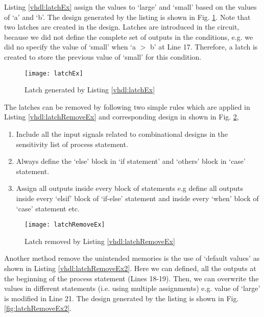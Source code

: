Listing \ref{vhdl:latchEx} assign the values to `large' and `small' based on the values of `a' and `b'. The design generated by the listing is shown in Fig. \ref{fig:latchEx}. Note that two latches are created in the design. Latches are introduced in the circuit, because we did not define the complete set of outputs in the conditions, e.g. we did no specify the value of `small' when `a $>$ b' at Line 17. Therefore, a latch is created to store the previous value of `small' for this condition. 



\begin{figure}[!h]
	\centering
	\texttt{[image: latchEx]}
	\caption{Latch generated by Listing \ref{vhdl:latchEx}}
	\label{fig:latchEx}
\end{figure}


\begin{noNumBox}
	The latches can be removed by following two simple rules which are applied in Listing \ref{vhdl:latchRemoveEx} and corresponding design in shown in Fig. \ref{fig:latchRemoveEx}, 
	\begin{enumerate}
		\item Include all the input signals related to combinational designs in the sensitivity list of process statement. 
		\item Always define the `else' block in `if statement' and `others' block in `case' statement. 
		\item Assign all outputs inside every block of statements e.g define all outputs inside every `elsif' block of `if-else' statement and inside every  `when' block of `case' statement etc. 
	\end{enumerate}
\end{noNumBox}



\begin{figure}
	\centering
	\texttt{[image: latchRemoveEx]}
	\caption{Latch removed by Listing \ref{vhdl:latchRemoveEx}}
	\label{fig:latchRemoveEx}
\end{figure}


Another method remove the unintended memories is the use of `default values' as shown in Listing \ref{vhdl:latchRemoveEx2}. Here we can defined, all the outputs at the beginning of the process statement (Lines 18-19). Then, we can overwrite the values in different statements (i.e. using multiple assignments) e.g. value of `large' is modified in Line 21. The design generated by the listing is shown in Fig. \ref{fig:latchRemoveEx2}. 

